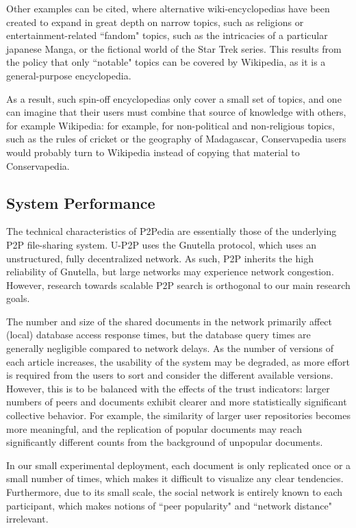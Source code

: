 Other examples can be cited, where alternative wiki-encyclopedias have been created to expand in great depth on narrow topics, such as religions or entertainment-related ``fandom" topics, such as the intricacies of a particular japanese Manga, or the fictional world of the Star Trek series. This results from the policy that only ``notable" topics can be covered by Wikipedia, as it is a general-purpose encyclopedia.

As a result, such spin-off encyclopedias only cover a small set of topics, and one can imagine that their users must combine that source of knowledge with others, for example Wikipedia: for example, for non-political and non-religious topics, such as the rules of cricket or the geography of Madagascar, Conservapedia users would probably turn to Wikipedia instead of copying that material to Conservapedia. 

\subsection{System Performance}

The technical characteristics of P2Pedia are essentially those of the underlying P2P file-sharing system. U-P2P uses the Gnutella protocol, which uses an unstructured, fully decentralized network. As such, P2P inherits the high reliability of Gnutella, but large networks may experience network congestion. However, research towards scalable P2P search is orthogonal to our main research goals.

The number and size of the shared documents in the network primarily affect (local) database access response times, but the database query times are generally negligible compared to network delays. As the number of versions of each article increases, the usability of the system may be degraded, as more effort is required from the users to sort and consider the different available versions. However, this is to be balanced with the effects of the trust indicators: larger numbers of peers and documents exhibit clearer and more statistically significant collective behavior. For example, the similarity of larger user repositories becomes more meaningful, and the replication of popular documents may reach significantly different counts from the background of unpopular documents. 

In our small experimental deployment, each document is only replicated once or a small number of times, which makes it difficult to visualize any clear tendencies. Furthermore, due to its small scale, the social network is entirely known to each participant, which makes notions of ``peer popularity" and ``network distance" irrelevant.  

